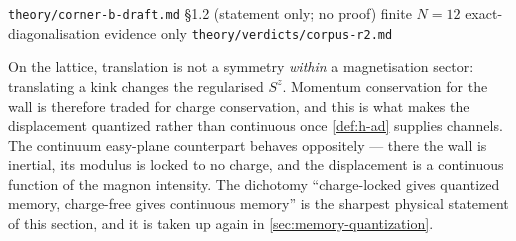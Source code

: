 %
{\texttt{theory/corner-b-draft.md} \S1.2 (statement only; no proof)}%
{finite $N=12$ exact-diagonalisation evidence only}%
{\texttt{theory/verdicts/corpus-r2.md}}

\begin{remark}
\label{rem:momentum-for-charge}
On the lattice, translation is not a symmetry \emph{within} a magnetisation
sector: translating a kink changes the regularised $S^z$. Momentum
conservation for the wall is therefore traded for charge conservation, and this
is what makes the displacement quantized rather than continuous once
\cref{def:h-ad} supplies channels. The continuum easy-plane counterpart
behaves oppositely --- there the wall is inertial, its modulus is locked to no
charge, and the displacement is a continuous function of the magnon intensity.
The dichotomy ``charge-locked gives quantized memory, charge-free gives
continuous memory'' is the sharpest physical statement of this section, and it
is taken up again in \cref{sec:memory-quantization}.
\end{remark}
